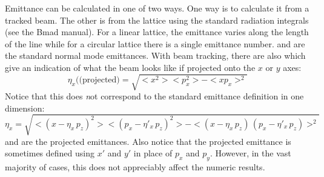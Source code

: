 Emittance can be calculated in one of two ways. One way is to
calculate it from a tracked beam. The other is from the lattice using
the standard radiation integrals (see the Bmad manual). For a linear
lattice, the emittance varies along the length of the line while for a
circular lattice there is a single emittance number. 
and  are the standard normal mode emittances. With
beam tracking, there are also  which give an
indication of what the beam looks like if projected onto the $x$ or
$y$ axes:
\begin{equation}
  \eta_x (\mbox{(projected)} = \sqrt{<x^2> <p_x^2> - <x p_x>^2}
\end{equation}
Notice that this does {\emph not} correspond to the standard emittance
definition in one dimension:
\begin{equation}
  \eta_x = \sqrt{<(x - \eta_x \, p_z)^2> <(p_x - \eta'_x \, p_z)^2> - 
  <(x - \eta_x \, p_z) \, (p_x - \eta'_x \, p_z)>^2}
\end{equation}
 and  are the projected emittances.
Also notice that the projected emittance is sometimes defined using
$x'$ and $y'$ in place of $p_x$ and $p_y$. However, in the vast
majority of cases, this does not appreciably affect the numeric
results.

